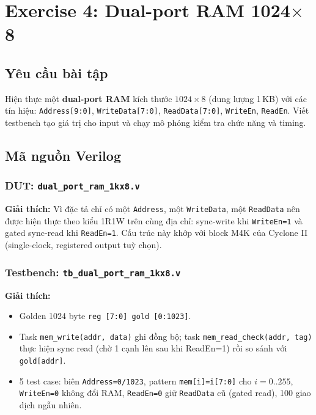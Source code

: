 \documentclass[12pt,a4paper]{article}
\begin{document}
\section{Exercise 4: Dual-port RAM 1024$\times$8}

\subsection{Yêu cầu bài tập}
Hiện thực một \textbf{dual-port RAM} kích thước $1024 \times 8$ (dung lượng 1\,KB) với các tín hiệu: \texttt{Address[9:0]}, \texttt{WriteData[7:0]}, \texttt{ReadData[7:0]}, \texttt{WriteEn}, \texttt{ReadEn}. Viết testbench tạo giá trị cho input và chạy mô phỏng kiểm tra chức năng và timing.

\subsection{Mã nguồn Verilog}

\subsubsection{DUT: \texttt{dual\_port\_ram\_1kx8.v}}


\textbf{Giải thích:} Vì đặc tả chỉ có một \texttt{Address}, một \texttt{WriteData}, một \texttt{ReadData} nên được hiện thực theo kiểu 1R1W trên cùng địa chỉ: sync-write khi \texttt{WriteEn=1} và gated sync-read khi \texttt{ReadEn=1}. Cấu trúc này khớp với block M4K của Cyclone II (single-clock, registered output tuỳ chọn).

\subsubsection{Testbench: \texttt{tb\_dual\_port\_ram\_1kx8.v}}


\textbf{Giải thích:}
\begin{itemize}[leftmargin=1.5cm]
    \item Golden 1024 byte \texttt{reg [7:0] gold [0:1023]}.
    \item Task \texttt{mem\_write(addr, data)} ghi đồng bộ; task \texttt{mem\_read\_check(addr, tag)} thực hiện sync read (chờ 1 cạnh lên sau khi ReadEn=1) rồi so sánh với \texttt{gold[addr]}.
    \item 5 test case: biên \texttt{Address=0/1023}, pattern \texttt{mem[i]=i[7:0]} cho $i=0..255$, \texttt{WriteEn=0} không đổi RAM, \texttt{ReadEn=0} giữ \texttt{ReadData} cũ (gated read), 100 giao dịch ngẫu nhiên.
\end{itemize}
\end{document}
